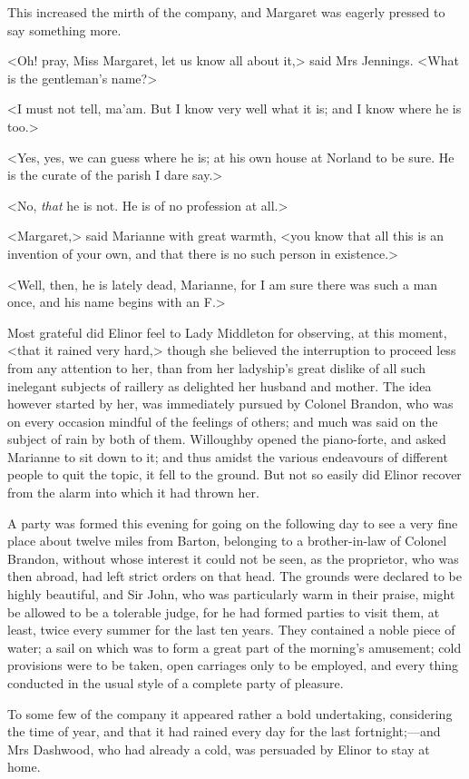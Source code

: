 This increased the mirth of the company, and Margaret was eagerly pressed to say something more.

<Oh! pray, Miss Margaret, let us know all about it,> said Mrs Jennings. <What is the gentleman's name?>

<I must not tell, ma'am. But I know very well what it is; and I know where he is too.>

<Yes, yes, we can guess where he is; at his own house at Norland to be sure. He is the curate of the parish I dare say.>

<No, \textit{that} he is not. He is of no profession at all.>

<Margaret,> said Marianne with great warmth, <you know that all this is an invention of your own, and that there is no such person in existence.>

<Well, then, he is lately dead, Marianne, for I am sure there was such a man once, and his name begins with an F\@.>

Most grateful did Elinor feel to Lady Middleton for observing, at this moment, <that it rained very hard,> though she believed the interruption to proceed less from any attention to her, than from her ladyship's great dislike of all such inelegant subjects of raillery as delighted her husband and mother. The idea however started by her, was immediately pursued by Colonel Brandon, who was on every occasion mindful of the feelings of others; and much was said on the subject of rain by both of them. Willoughby opened the piano-forte, and asked Marianne to sit down to it; and thus amidst the various endeavours of different people to quit the topic, it fell to the ground. But not so easily did Elinor recover from the alarm into which it had thrown her.

A party was formed this evening for going on the following day to see a very fine place about twelve miles from Barton, belonging to a brother-in-law of Colonel Brandon, without whose interest it could not be seen, as the proprietor, who was then abroad, had left strict orders on that head. The grounds were declared to be highly beautiful, and Sir John, who was particularly warm in their praise, might be allowed to be a tolerable judge, for he had formed parties to visit them, at least, twice every summer for the last ten years. They contained a noble piece of water; a sail on which was to form a great part of the morning's amusement; cold provisions were to be taken, open carriages only to be employed, and every thing conducted in the usual style of a complete party of pleasure.

To some few of the company it appeared rather a bold undertaking, considering the time of year, and that it had rained every day for the last fortnight;—and Mrs Dashwood, who had already a cold, was persuaded by Elinor to stay at home.

\begin{a4}
	\enlargethispage{\baselineskip}
\end{a4}